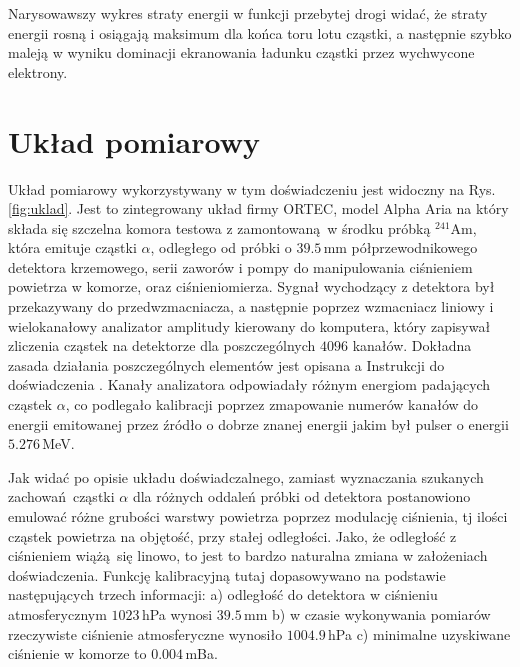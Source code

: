 \documentclass[pra,
superscriptaddress,
amssymb,amsmath,amsmath,showpacs,reprint,twocolumn]{revtex4-1}
\begin{document}
Narysowawszy wykres straty energii w funkcji przebytej drogi widać, że straty energii rosną i osiągają maksimum dla końca toru lotu cząstki, a następnie szybko maleją w wyniku dominacji ekranowania ładunku cząstki przez wychwycone elektrony.

\section{Układ pomiarowy}

Układ pomiarowy wykorzystywany w tym doświadczeniu jest widoczny na Rys. \ref{fig:uklad}. Jest to zintegrowany układ firmy ORTEC, model Alpha Aria na który składa się szczelna komora testowa z zamontowaną w środku próbką $^{241}$Am, która emituje cząstki $\alpha$, odległego od próbki o $39.5$\,mm półprzewodnikowego detektora krzemowego, serii zaworów i pompy do manipulowania ciśnieniem powietrza w komorze, oraz ciśnieniomierza. Sygnał wychodzący z detektora był przekazywany do przedwzmacniacza, a następnie poprzez wzmacniacz liniowy i wielokanałowy analizator amplitudy kierowany do komputera, który zapisywał zliczenia cząstek na detektorze dla poszczególnych $4096$ kanałów. Dokładna zasada działania poszczególnych elementów jest opisana a Instrukcji do doświadczenia \cite{instrukcja}. Kanały analizatora odpowiadały różnym energiom padających cząstek $\alpha$, co podlegało kalibracji poprzez zmapowanie numerów kanałów do energii emitowanej przez źródło o dobrze znanej energii jakim był pulser o energii $5.276$\,MeV. 

Jak widać po opisie układu doświadczalnego, zamiast wyznaczania szukanych zachowań cząstki $\alpha$ dla różnych oddaleń próbki od detektora postanowiono emulować różne grubości warstwy powietrza poprzez modulację ciśnienia, tj ilości cząstek powietrza na objętość, przy stałej odległości. Jako, że odległość z ciśnieniem wiążą się linowo, to jest to bardzo naturalna zmiana w założeniach doświadczenia. Funkcję kalibracyjną tutaj dopasowywano na podstawie następujących trzech informacji: a) odległość do detektora w ciśnieniu atmosferycznym $1023$\,hPa wynosi $39.5$\,mm b) w czasie wykonywania pomiarów rzeczywiste ciśnienie atmosferyczne wynosiło $1004.9$\,hPa c) minimalne uzyskiwane ciśnienie w komorze to $0.004$\,mBa.
\end{document}
